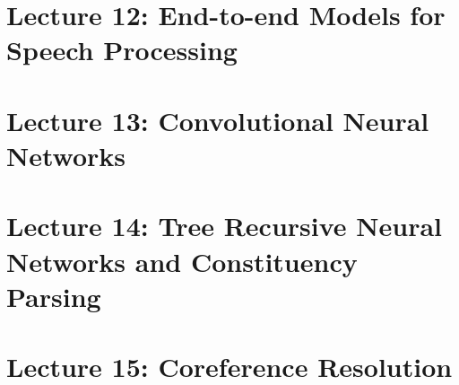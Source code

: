 \documentclass{article}
\begin{document}
\section{Lecture 12: End-to-end Models for Speech Processing}

\section{Lecture 13: Convolutional Neural Networks}

\section{Lecture 14: Tree Recursive Neural Networks and Constituency Parsing}

\section{Lecture 15: Coreference Resolution}

\end{document}
